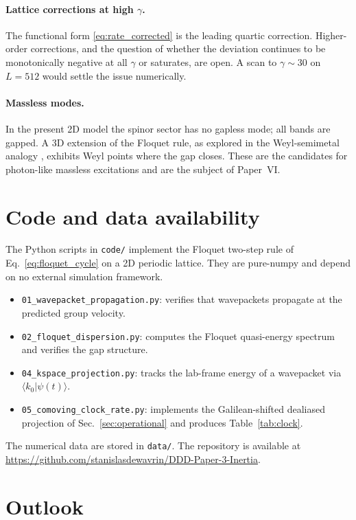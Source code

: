 \documentclass[11pt,a4paper]{article}
\begin{document}
\paragraph{Lattice corrections at high $\gamma$.}
The functional form \eqref{eq:rate_corrected} is the leading
quartic correction. Higher-order corrections, and the question
of whether the deviation continues to be monotonically negative
at all $\gamma$ or saturates, are open. A scan to
$\gamma \sim 30$ on $L = 512$ would settle the issue
numerically.

\paragraph{Massless modes.}
In the present 2D model the spinor sector has no gapless mode;
all bands are gapped. A 3D extension of the Floquet rule, as
explored in the Weyl-semimetal analogy \cite{armitage2018},
exhibits Weyl points where the gap closes. These are the
candidates for photon-like massless excitations and are the
subject of Paper~VI.

\section{Code and data availability}
\label{sec:code}

The Python scripts in \texttt{code/} implement the Floquet
two-step rule of Eq.~\eqref{eq:floquet_cycle} on a 2D periodic
lattice. They are pure-numpy and depend on no external
simulation framework.

\begin{itemize}
\item \texttt{01\_wavepacket\_propagation.py}: verifies
that wavepackets propagate at the predicted group velocity.
\item \texttt{02\_floquet\_dispersion.py}: computes the Floquet
quasi-energy spectrum and verifies the gap structure.
\item \texttt{04\_kspace\_projection.py}: tracks the lab-frame
energy of a wavepacket via $\langle k_0 | \psi(t) \rangle$.
\item \texttt{05\_comoving\_clock\_rate.py}: implements the
Galilean-shifted dealiased projection of
Sec.~\ref{sec:operational} and produces
Table~\ref{tab:clock}.
\end{itemize}
The numerical data are stored in \texttt{data/}. The repository
is available at
\url{https://github.com/stanislasdewavrin/DDD-Paper-3-Inertia}.

\section{Outlook}
\label{sec:outlook}
\end{document}
